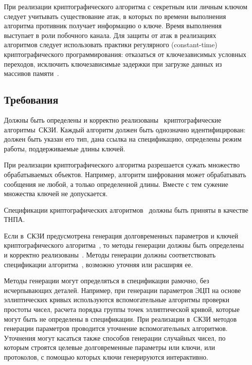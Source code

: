 При реализации криптографического алгоритма с секретным или личным ключом 
следует учитывать существование атак, в которых по времени выполнения алгоритма
противник получает информацию о ключе. Время выполнения выступает в роли 
побочного канала.
%
Для защиты от атак в реализациях алгоритмов следует использовать практики 
регулярного (constant-time) криптографического программирования: отказаться от 
ключезависимых условных переходов, исключить ключезависимые задержки при 
загрузке данных из массивов памяти~.

\subsection{Требования}\label{CS.Reqs}

\label{R.CS.Algs} %
Должны быть определены и корректно реализованы~
криптографические алгоритмы~СКЗИ. 
%
Каждый алгоритм должен быть однозначно идентифицирован: должен быть указан его
тип, дана ссылка на спецификацию, определены режим работы, поддерживаемые длины
ключей.

\begin{note*}
При реализации криптографического алгоритма разрешается сужать множество
обрабатываемых объектов. Например, алгоритм шифрования может обрабатывать
сообщения не любой, а только определенной длины. Вместе с тем сужение множества
ключей не допускается.
\end{note*}

\label{R.CS.Std} %
Спецификации криптографических алгоритмов~
должны быть приняты в качестве ТНПА.

\label{R.CS.Gen} %
Если в~СКЗИ предусмотрена генерация долговременных параметров и ключей 
криптографического алгоритма~, то методы генерации 
должны быть определены и корректно реализованы~.
%
Методы генерации должны соответствовать спецификации
алгоритма~, возможно уточняя или расширяя ее.

\begin{note*}
Методы генерации могут определяться в спецификации рамочно, без исчерпывающих 
деталей.
%
Например, при генерации параметров ЭЦП на основе эллиптических кривых
используются вспомогательные алгоритмы проверки простоты чисел, расчета порядка
группы точек эллиптической кривой, которые могут быть не определены в спецификации.
%
При реализации в~СКЗИ методов генерации параметров проводится уточнение 
вспомогательных алгоритмов.
%
Уточнения могут касаться также способов генерации случайных чисел,
по которым строятся целевые долговременные параметры или ключи,
или протоколов, с помощью которых ключи генерируются интерактивно.
\end{note*}

